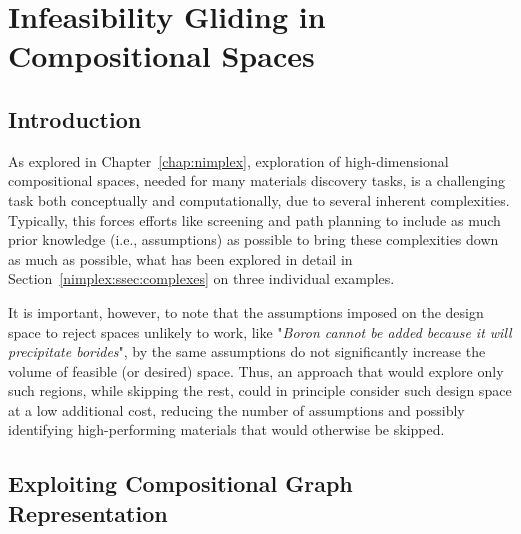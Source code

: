 \chapter{Infeasibility Gliding in Compositional Spaces} \label{chap:infeasibilitygliding}


\section{Introduction} \label{infglide:sec:intro}

As explored in Chapter~\ref{chap:nimplex}, exploration of high-dimensional compositional spaces, needed for many materials discovery tasks, is a challenging task both conceptually and computationally, due to several inherent complexities. Typically, this forces efforts like screening and path planning to include as much prior knowledge (i.e., assumptions) as possible to bring these complexities down as much as possible, what has been explored in detail in Section~\ref{nimplex:ssec:complexes} on three individual examples.

It is important, however, to note that the assumptions imposed on the design space to reject spaces unlikely to work, like "\textit{Boron cannot be added because it will precipitate borides}", by the same assumptions do not significantly increase the volume of feasible (or desired) space. Thus, an approach that would explore only such regions, while skipping the rest, could in principle consider such design space at a low additional cost, reducing the number of assumptions and possibly identifying high-performing materials that would otherwise be skipped.

\section{Exploiting Compositional Graph Representation} \label{infglide:sec:exploitgraph}



